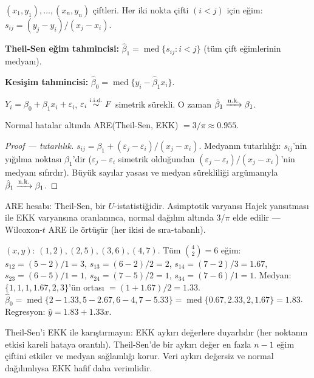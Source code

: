 \begin{tanim}\label{def:theil_sen}
$(x_1,y_1),\ldots,(x_n,y_n)$ çiftleri. Her iki nokta çifti $(i<j)$ için eğim: $s_{ij}=(y_j-y_i)/(x_j-x_i)$.

\textbf{Theil-Sen eğim tahmincisi:} $\hat\beta_1 = \operatorname{med}\{s_{ij}: i<j\}$ (tüm çift eğimlerinin medyanı).

\textbf{Kesişim tahmincisi:} $\hat\beta_0 = \operatorname{med}\{y_i - \hat\beta_1 x_i\}$.
\end{tanim}

\begin{teorem}\label{thm:theil_sen}
$Y_i = \beta_0 + \beta_1 x_i + \varepsilon_i$, $\varepsilon_i\overset{\text{i.i.d.}}{\sim} F$ simetrik sürekli. O zaman $\hat\beta_1\xrightarrow{\text{n.k.}}\beta_1$.

Normal hatalar altında ARE(Theil-Sen, EKK) $= 3/\pi \approx 0.955$.
\end{teorem}

\begin{proof}[Proof --- tutarlılık]
$s_{ij} = \beta_1 + (\varepsilon_j-\varepsilon_i)/(x_j-x_i)$. Medyanın tutarlılığı: $s_{ij}$'nin yığılma noktası $\beta_1$'dir ($\varepsilon_j-\varepsilon_i$ simetrik olduğundan $(\varepsilon_j-\varepsilon_i)/(x_j-x_i)$'nin medyanı sıfırdır). Büyük sayılar yasası ve medyan sürekliliği argümanıyla $\hat\beta_1\xrightarrow{\text{n.k.}}\beta_1$.
\end{proof}

\begin{ispatiskele}
ARE hesabı: Theil-Sen, bir $U$-istatistiğidir. Asimptotik varyansı Hajek yansıtması ile EKK varyansına oranlanınca, normal dağılım altında $3/\pi$ elde edilir --- Wilcoxon-$t$ ARE ile örtüşür (her ikisi de sıra-tabanlı).
\end{ispatiskele}

\begin{ornek}
$(x,y)$: $(1,2),(2,5),(3,6),(4,7)$. Tüm $\binom{4}{2}=6$ eğim:
$s_{12}=(5-2)/1=3$, $s_{13}=(6-2)/2=2$, $s_{14}=(7-2)/3=1.67$,
$s_{23}=(6-5)/1=1$, $s_{24}=(7-5)/2=1$, $s_{34}=(7-6)/1=1$.
Medyan: $\{1,1,1,1.67,2,3\}$'ün ortası $=(1+1.67)/2=1.33$.
$\hat\beta_0=\operatorname{med}\{2-1.33,5-2.67,6-4,7-5.33\}=\operatorname{med}\{0.67,2.33,2,1.67\}=1.83$.
Regresyon: $\hat{y}=1.83+1.33x$.
\end{ornek}

\begin{hataanalizi}
Theil-Sen'i EKK ile karıştırmayın: EKK aykırı değerlere duyarlıdır (her noktanın etkisi kareli hataya orantılı). Theil-Sen'de bir aykırı değer en fazla $n-1$ eğim çiftini etkiler ve medyan sağlamlığı korur. Veri aykırı değersiz ve normal dağılımlıysa EKK hafif daha verimlidir.
\end{hataanalizi}

